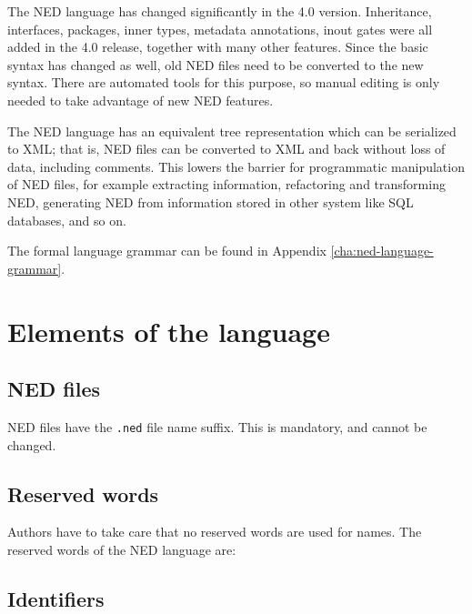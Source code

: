 \begin{note}
    The NED language has changed significantly in the 4.0 version.
    Inheritance, interfaces, packages, inner types, metadata annotations, inout
    gates were all added in the 4.0 release, together with many other features.
    Since the basic syntax has changed as well, old NED files need to be
    converted to the new syntax. There are automated tools for this purpose, so
    manual editing is only needed to take advantage of new NED features.
\end{note}

The NED language has an equivalent tree representation which can be
serialized to XML; that is, NED files can be converted to XML and back
without loss of data, including comments. This lowers the barrier for
programmatic manipulation of NED files, for example extracting information,
refactoring and transforming NED, generating NED from information stored in
other system like SQL databases, and so on.

The formal language grammar can be found in Appendix
\ref{cha:ned-language-grammar}.

\section{Elements of the language}

\subsection{NED files}

NED files have the \texttt{.ned} file name suffix. This is mandatory, and
cannot be changed.


\subsection{Reserved words}

Authors have to take care that no reserved words are used for names.
The reserved words of the NED language are:



\subsection{Identifiers}

